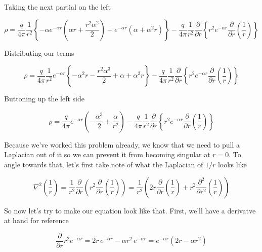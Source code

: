 Taking the next partial on the left

\begin{equation}
  \rho
  = \frac{q}{4\pi}
  \frac{1}{r^2}
  \left\{
  -\alpha e^{-\alpha r}
  \left(
  \alpha r
  + \frac{r^2\alpha^2}{2}
  \right)
  + e^{-\alpha r}
  \left(
  \alpha
  + \alpha^2 r
  \right)
  \right\}
  -\frac{q}{4\pi}  
  \frac{1}{r^2}
  \frac{\partial}{\partial r}
  \left\{
  r^2
  e^{-\alpha r}
  \frac{\partial}{\partial r}  
  \left(\frac{1}{r}\right)
  \right\}
\end{equation}

Distributing our terms

\begin{equation}
  \rho
  = \frac{q}{4\pi}
  \frac{1}{r^2}
  e^{-\alpha r}
  \left\{
  -\alpha^2 r
  - \frac{r^2\alpha^3}{2}
  + \alpha
  + \alpha^2 r
  \right\}
  -\frac{q}{4\pi}  
  \frac{1}{r^2}
  \frac{\partial}{\partial r}
  \left\{
  r^2
  e^{-\alpha r}
  \frac{\partial}{\partial r}  
  \left(\frac{1}{r}\right)
  \right\}
\end{equation}

Buttoning up the left side

\begin{equation}
  \rho
  = \frac{q}{4\pi}
  e^{-\alpha r}
  \left(
  - \frac{\alpha^3}{2}
  + \frac{\alpha}{r^2}
  \right)
  -\frac{q}{4\pi}  
  \frac{1}{r^2}
  \frac{\partial}{\partial r}
  \left\{
  r^2
  e^{-\alpha r}
  \frac{\partial}{\partial r}  
  \left(\frac{1}{r}\right)
  \right\}
\end{equation}

Because we've worked this problem already, we know that we need to
pull a Laplacian out of it so we can prevent it from becoming singular
at $r=0$.  To angle towards that, let's first take note of what the
Laplacian of $1/r$ looks like

\begin{equation}
  \nabla^2 \left(\frac{1}{r}\right)
  = \frac{1}{r^2} \frac{\partial}{\partial r}
  \left(r^2 \frac{\partial}{\partial r}\left(\frac{1}{r}\right) \right)
  = \frac{1}{r^2} \left(
  2r\frac{\partial}{\partial r}\left(\frac{1}{r}\right)
  + r^2\frac{\partial^2}{\partial r^2}\left(\frac{1}{r}\right)
  \right)
\end{equation}

So now let's try to make our equation look like that.  First, we'll
have a derivatve at hand for reference

\begin{equation}
  \frac{\partial}{\partial r}
  r^2
  e^{-\alpha r}
  = 2r\,e^{-\alpha r}
  - \alpha r^2\,e^{-\alpha r}
  = e^{-\alpha r} \left( 2r - \alpha r^2 \right)
\end{equation}

